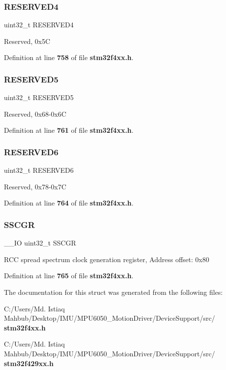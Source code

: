 \subsubsection{R\+E\+S\+E\+R\+V\+E\+D4}
{\footnotesize\ttfamily uint32\+\_\+t R\+E\+S\+E\+R\+V\+E\+D4}

Reserved, 0x5C 

Definition at line \textbf{ 758} of file \textbf{ stm32f4xx.\+h}.

\mbox{\label{structRCC__TypeDef_a99d0f80afb3d4e8ea9c465096498c327}} 
\subsubsection{R\+E\+S\+E\+R\+V\+E\+D5}
{\footnotesize\ttfamily uint32\+\_\+t R\+E\+S\+E\+R\+V\+E\+D5}

Reserved, 0x68-\/0x6C 

Definition at line \textbf{ 761} of file \textbf{ stm32f4xx.\+h}.

\mbox{\label{structRCC__TypeDef_ac2f0dff647e768676abe64fb2bde63be}} 
\subsubsection{R\+E\+S\+E\+R\+V\+E\+D6}
{\footnotesize\ttfamily uint32\+\_\+t R\+E\+S\+E\+R\+V\+E\+D6}

Reserved, 0x78-\/0x7C 

Definition at line \textbf{ 764} of file \textbf{ stm32f4xx.\+h}.

\mbox{\label{structRCC__TypeDef_aaef3da59eaf7c6dfdf9a12fd60ce58a8}} 
\subsubsection{S\+S\+C\+GR}
{\footnotesize\ttfamily \+\_\+\+\_\+\+IO uint32\+\_\+t S\+S\+C\+GR}

R\+CC spread spectrum clock generation register, Address offset\+: 0x80 

Definition at line \textbf{ 765} of file \textbf{ stm32f4xx.\+h}.



The documentation for this struct was generated from the following files\+:\begin{DoxyCompactItemize}
\item 
C\+:/\+Users/\+Md. Istiaq Mahbub/\+Desktop/\+I\+M\+U/\+M\+P\+U6050\+\_\+\+Motion\+Driver/\+Device\+Support/src/\textbf{ stm32f4xx.\+h}\item 
C\+:/\+Users/\+Md. Istiaq Mahbub/\+Desktop/\+I\+M\+U/\+M\+P\+U6050\+\_\+\+Motion\+Driver/\+Device\+Support/src/\textbf{ stm32f429xx.\+h}\end{DoxyCompactItemize}
